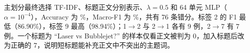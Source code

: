 主划分最终选择 TF-IDF、标题正文分别表示、$\lambda=0.5$ 和 64 单元 MLP（$\alpha=10^{-4}$），Accuracy 为 \SelectedAccuracy\%，Macro-F1 为 \SelectedFone\%，共有 76 条错分。标签 2 的 F1 最低（86.90\%），标签 9 最高（98.94\%）；1$\rightarrow$2 与 2$\rightarrow$1 各有 9 例，2$\rightarrow$7 有 7 例。一个标题为 ``Laser vs Bubblejet?'' 的样本仅看正文被判为 0，加入标题后改为正确的 7，说明短标题能补充正文中不突出的主题词。
